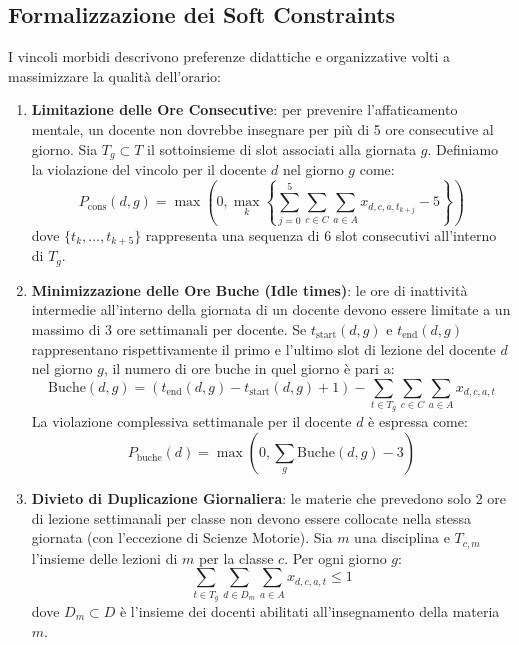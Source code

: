 \subsection{Formalizzazione dei Soft Constraints}
\label{subsec:soft-saffi}

I vincoli morbidi descrivono preferenze didattiche e organizzative volti a massimizzare la qualità dell'orario:

\begin{enumerate}
    \item \textbf{Limitazione delle Ore Consecutive}: per prevenire l'affaticamento mentale, un docente non dovrebbe insegnare per più di 5 ore consecutive al giorno. Sia $T_g \subset T$ il sottoinsieme di slot associati alla giornata $g$. Definiamo la violazione del vincolo per il docente $d$ nel giorno $g$ come:
    \begin{equation}
    P_{\text{cons}}(d, g) = \max \left( 0, \max_{k} \left\{ \sum_{j=0}^{5} \sum_{c \in C} \sum_{a \in A} x_{d,c,a,t_{k+j}} - 5 \right\} \right)
    \label{eq:ore-consecutive}
    \end{equation}
    dove $\{t_k, \dots, t_{k+5}\}$ rappresenta una sequenza di 6 slot consecutivi all'interno di $T_g$.

    \item \textbf{Minimizzazione delle Ore Buche (Idle times)}: le ore di inattività intermedie all'interno della giornata di un docente devono essere limitate a un massimo di 3 ore settimanali per docente. Se $t_{\text{start}}(d, g)$ e $t_{\text{end}}(d, g)$ rappresentano rispettivamente il primo e l'ultimo slot di lezione del docente $d$ nel giorno $g$, il numero di ore buche in quel giorno è pari a:
    \begin{equation}
    \text{Buche}(d, g) = (t_{\text{end}}(d, g) - t_{\text{start}}(d, g) + 1) - \sum_{t \in T_g} \sum_{c \in C} \sum_{a \in A} x_{d,c,a,t}
    \label{eq:ore-buche-giorno}
    \end{equation}
    La violazione complessiva settimanale per il docente $d$ è espressa come:
    \begin{equation}
    P_{\text{buche}}(d) = \max \left( 0, \sum_{g} \text{Buche}(d, g) - 3 \right)
    \label{eq:ore-buche-settimana}
    \end{equation}

    \item \textbf{Divieto di Duplicazione Giornaliera}: le materie che prevedono solo 2 ore di lezione settimanali per classe non devono essere collocate nella stessa giornata (con l'eccezione di Scienze Motorie). Sia $m$ una disciplina e $T_{c,m}$ l'insieme delle lezioni di $m$ per la classe $c$. Per ogni giorno $g$:
    \begin{equation}
    \sum_{t \in T_g} \sum_{d \in D_m} \sum_{a \in A} x_{d,c,a,t} \le 1
    \label{eq:duplicazione}
    \end{equation}
    dove $D_m \subset D$ è l'insieme dei docenti abilitati all'insegnamento della materia $m$.
\end{enumerate}

